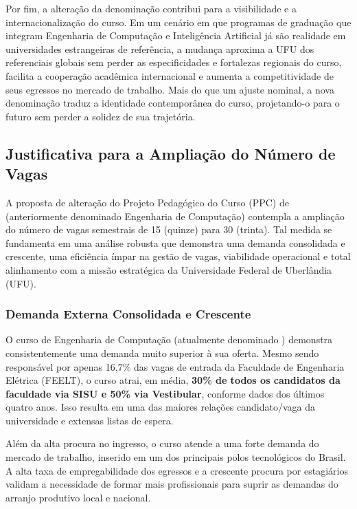 Por fim, a alteração da denominação contribui para a visibilidade e a internacionalização do curso. Em um cenário em que programas de graduação que integram Engenharia de Computação e Inteligência Artificial já são realidade em universidades estrangeiras de referência, a mudança aproxima a UFU dos referenciais globais sem perder as especificidades e fortalezas regionais do curso, facilita a cooperação acadêmica internacional e aumenta a competitividade de seus egressos no mercado de trabalho. Mais do que um ajuste nominal, a nova denominação traduz a identidade contemporânea do curso, projetando-o para o futuro sem perder a solidez de sua trajetória.

\subsection{Justificativa para a Ampliação do Número de Vagas}

A proposta de alteração do Projeto Pedagógico do Curso (PPC) de \nomecursonovo (anteriormente denominado Engenharia de Computação) contempla a ampliação do número de vagas semestrais de 15 (quinze) para 30 (trinta). Tal medida se fundamenta em uma análise robusta que demonstra uma demanda consolidada e crescente, uma eficiência ímpar na gestão de vagas, viabilidade operacional e total alinhamento com a missão estratégica da Universidade Federal de Uberlândia (UFU).

\subsubsection*{Demanda Externa Consolidada e Crescente}

O curso de Engenharia de Computação (atualmente denominado \nomecursonovo) demonstra consistentemente uma demanda muito superior à sua oferta. Mesmo sendo responsável por apenas 16,7\% das vagas de entrada da Faculdade de Engenharia Elétrica (FEELT), o curso atrai, em média, \textbf{30\% de todos os candidatos da faculdade via SISU e 50\% via Vestibular}, conforme dados dos últimos quatro anos. Isso resulta em uma das maiores relações candidato/vaga da universidade e extensas listas de espera.

Além da alta procura no ingresso, o curso atende a uma forte demanda do mercado de trabalho, inserido em um dos principais polos tecnológicos do Brasil. A alta taxa de empregabilidade dos egressos e a crescente procura por estagiários validam a necessidade de formar mais profissionais para suprir as demandas do arranjo produtivo local e nacional.

